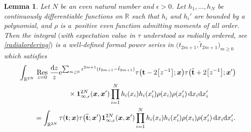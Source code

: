 \documentclass[10pt,a4paper]{amsart}
\numberwithin{equation}{section}
\newcommand{\dd}{\mathrm{d}}
\newcommand{\Res}{\mathop{\,\rm Res\,}}
\newtheorem{Lemma}[Theorem]{Lemma}
\begin{document}
\begin{Lemma}
\label{thm:BKPlem}
Let $N$ be an even natural number and $\epsilon >0$. Let
$h_1,\dots,h_N$ be continuously differentiable functions on $\mathbb{R}$
such that $h_i$ and $h_i'$ are bounded by a
polynomial, and $\rho$ is a~positive even function admitting moments
of all order. Then the integral $($with expectation value in $\tau$
understood as radially ordered, see \eqref{radialordering}$)$ is a
well-defined formal power series in
$\bigl(t_{2m+1},\tilde{t}_{2m + 1}\bigr)_{m \geq 0}$ which satisfies
\begin{gather*}
 \int_{\mathbb{R}^{2N}} \Res_{z = 0} \frac{\dd z}{z}
{\rm e}^{\sum_{m \geq 0} z^{2m+1}(t_{2m+1}-\tilde{t}_{2m+1})} \tau\bigl(\mathbf{t} - 2\bigl[z^{-1}\bigr];\boldsymbol{x}\bigr) \tau\bigl(\tilde{\mathbf{t}} + 2\bigl[z^{-1}\bigr];\boldsymbol{x}'\bigr) \\
 \qquad\quad{} \times \mathbf{1}_{\infty,\epsilon}^{2N}(\boldsymbol{x},\boldsymbol{x}') \prod_{i = 1}^{N} h_i(x_i)h_i(x_i')\rho(x_i)\rho(x_i') \, \dd x_i \dd x_i' \\
\qquad {}= \int_{\mathbb{R}^{2N}} \tau(\mathbf{t};\boldsymbol{x}) \tau\bigl(\tilde{\mathbf{t}};\boldsymbol{x}'\bigr)\mathbf{1}_{\infty,\epsilon}^{2N}(\boldsymbol{x},\boldsymbol{x}') \prod_{i = 1}^{N} h_i(x_i)h_i(x_i') \rho(x_i)\rho(x_i')\,\dd x_i \dd x_i'.
\end{gather*}
\end{Lemma}
\end{document}
